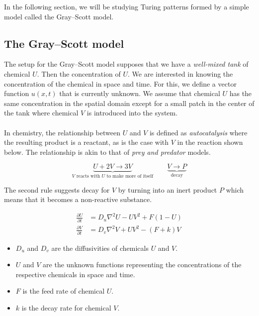 \documentclass[a4paper, 11pt]{article}
\begin{document}
In the following section, we will be studying Turing patterns formed by a simple model called the Gray--Scott model.

\subsection{The Gray--Scott model}
\label{sec:gray-scott}

The setup for the Gray--Scott model supposes that we have a \emph{well-mixed tank} of chemical $U$. Then the concentration of $U$. We are interested in knowing the concentration of the chemical in space and time. For this, we define a vector function $u(x, t)$  that is currently unknown. We assume that chemical $U$ has the same concentration in the spatial domain except for a small patch in the center of the tank where chemical $V$ is introduced into the system. \\
\\
In chemistry, the relationship between $U$ and $V$ is defined as \textit{autocatalysis} where the resulting product is a reactant, as is the case with $V$ in the reaction shown below. The relationship is akin to that of \textit{prey and predator} models.

\begin{equation*}
	\underbrace{U + 2V \to 3V}_{\text{$V$ reacts with $U$ to make more of itself}}
	\qquad
	\underbrace{V \to P}_{\text{decay}}
\end{equation*}


The second rule suggests decay for $V$ by turning into an inert product $P$ which means that it becomes a non-reactive substance.


\begin{align*}
	\frac{\partial U}{\partial t} & = D_u \nabla^2 U - UV^2 + F(1 - U) \\
	\frac{\partial V}{\partial t} & = D_v \nabla^2 V + UV^2 - (F + k)V
\end{align*}
\begin{itemize}
	\item $D_u$ and $D_v$ are the diffusivities of chemicals $U$ and $V$.
	\item $U$ and $V$ are the unknown functions representing the concentrations of the respective chemicals in space and time.
	\item $F$ is the feed rate of chemical $U$.
	\item $k$ is the decay rate for chemical $V$.
\end{itemize}
\end{document}
